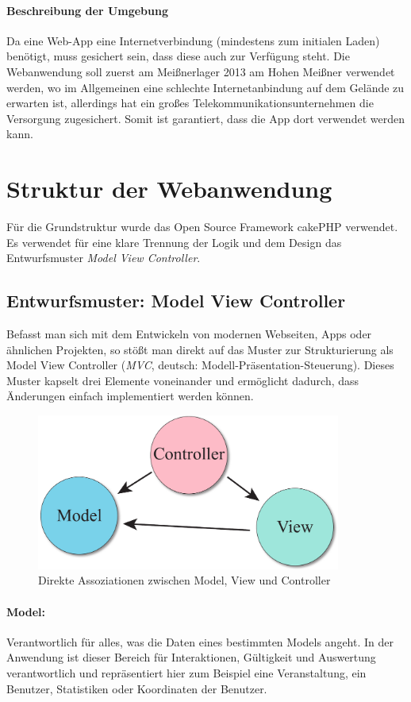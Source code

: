 \paragraph{Beschreibung der Umgebung}
Da eine Web-App eine Internetverbindung (mindestens zum initialen Laden) benötigt, muss gesichert sein, dass diese auch zur Verfügung steht. Die Webanwendung soll zuerst am Meißnerlager 2013 am Hohen Meißner verwendet werden, wo im Allgemeinen eine schlechte Internetanbindung auf dem Gelände zu erwarten ist, allerdings hat ein großes Telekommunikationsunternehmen die Versorgung zugesichert. Somit ist garantiert, dass die App dort verwendet werden kann.

\section{Struktur der Webanwendung}
Für die Grundstruktur wurde das Open Source Framework cakePHP verwendet. Es verwendet für eine klare Trennung der Logik und dem Design das Entwurfsmuster \emph{Model View Controller}.

\subsection{Entwurfsmuster: Model View Controller}
Befasst man sich mit dem Entwickeln von modernen Webseiten, Apps oder ähnlichen Projekten, so stößt man direkt auf das Muster zur Strukturierung als Model View Controller (\emph{MVC}, deutsch: Modell-Präsentation-Steuerung). Dieses Muster kapselt drei Elemente voneinander und ermöglicht dadurch, dass Änderungen einfach implementiert werden können.

\begin{figure}[!ht]
	\centering
	\includegraphics[width=10cm]{fig/mvc}
	\caption{Direkte Assoziationen zwischen Model, View und Controller}
\end{figure}

\paragraph{Model:}
Verantwortlich für alles, was die Daten eines bestimmten Models angeht. In der Anwendung ist dieser Bereich für Interaktionen, Gültigkeit und Auswertung verantwortlich und repräsentiert hier zum Beispiel eine Veranstaltung, ein Benutzer, Statistiken oder Koordinaten der Benutzer.

